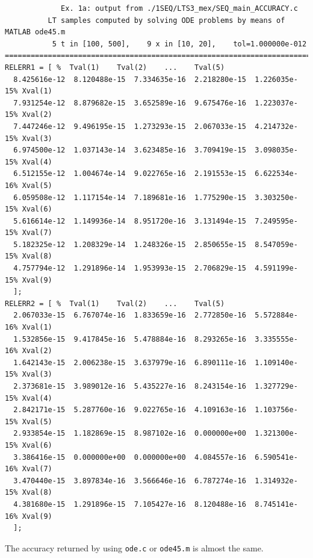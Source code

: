 \documentclass[a4paper,10pt]{report}%
\begin{document}
\begin{lstlisting}
             Ex. 1a: output from ./1SEQ/LTS3_mex/SEQ_main_ACCURACY.c
          LT samples computed by solving ODE problems by means of MATLAB ode45.m
           5 t in [100, 500],    9 x in [10, 20],    tol=1.000000e-012
====================================================================================
RELERR1 = [ %  Tval(1)    Tval(2)    ...    Tval(5)
  8.425616e-12  8.120488e-15  7.334635e-16  2.218280e-15  1.226035e-15% Xval(1)
  7.931254e-12  8.879682e-15  3.652589e-16  9.675476e-16  1.223037e-15% Xval(2)
  7.447246e-12  9.496195e-15  1.273293e-15  2.067033e-15  4.214732e-15% Xval(3)
  6.974500e-12  1.037143e-14  3.623485e-16  3.709419e-15  3.098035e-15% Xval(4)
  6.512155e-12  1.004674e-14  9.022765e-16  2.191553e-15  6.622534e-16% Xval(5)
  6.059508e-12  1.117154e-14  7.189681e-16  1.775290e-15  3.303250e-15% Xval(6)
  5.616614e-12  1.149936e-14  8.951720e-16  3.131494e-15  7.249595e-15% Xval(7)
  5.182325e-12  1.208329e-14  1.248326e-15  2.850655e-15  8.547059e-15% Xval(8)
  4.757794e-12  1.291896e-14  1.953993e-15  2.706829e-15  4.591199e-15% Xval(9)
  ];
RELERR2 = [ %  Tval(1)    Tval(2)    ...    Tval(5)
  2.067033e-15  6.767074e-16  1.833659e-16  2.772850e-16  5.572884e-16% Xval(1)
  1.532856e-15  9.417845e-16  5.478884e-16  8.293265e-16  3.335555e-16% Xval(2)
  1.642143e-15  2.006238e-15  3.637979e-16  6.890111e-16  1.109140e-15% Xval(3)
  2.373681e-15  3.989012e-16  5.435227e-16  8.243154e-16  1.327729e-15% Xval(4)
  2.842171e-15  5.287760e-16  9.022765e-16  4.109163e-16  1.103756e-15% Xval(5)
  2.933854e-15  1.182869e-15  8.987102e-16  0.000000e+00  1.321300e-15% Xval(6)
  3.386416e-15  0.000000e+00  0.000000e+00  4.084557e-16  6.590541e-16% Xval(7)
  3.470440e-15  3.897834e-16  3.566646e-16  6.787274e-16  1.314932e-15% Xval(8)
  4.381680e-15  1.291896e-15  7.105427e-16  8.120488e-16  8.745141e-16% Xval(9)
  ];
\end{lstlisting}
The accuracy returned by using {\tt ode.c} or {\tt ode45.m} is almost the same.
\end{document}
